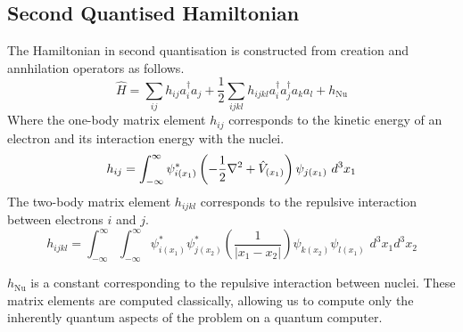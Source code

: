\subsection{Second Quantised Hamiltonian}
The Hamiltonian in second quantisation is constructed from creation and annhilation operators as follows.
\begin{equation*}
    \hat H =
    \sum_{ij} h_{ij} a^\dagger_i a_j +
    \frac{1}{2} \sum_{ijkl} h_{ijkl} a^\dagger_i a^\dagger_j a_k a_l +
    h_\text{Nu}
\end{equation*}
Where the one-body matrix element $h_{ij}$ corresponds to the kinetic energy of an electron and its interaction energy with the nuclei.
\begin{equation*}
h_{ij} = \int^\infty_{-\infty} \psi^*_{i(x_1)} \left( - \frac{1}{2} \nabla^2 + \hat V_{(x_1)} \right) \psi_{j(x_1)} \,\, d^3 x_1 \\
\end{equation*}
The two-body matrix element $h_{ijkl}$ corresponds to the repulsive interaction between electrons $i$ and $j$.
\begin{equation*}
h_{ijkl} = \int^\infty_{-\infty} \int^\infty_{-\infty} \psi^*_{i(x_1)} \psi^*_{j(x_2)} \left( \frac{1}{|x_1 - x_2|} \right) \psi_{k(x_2)} \psi_{l(x_1)} \,\, d^3 x_1 d^3 x_2
\end{equation*}

$h_\text{Nu}$ is a constant corresponding to the repulsive interaction between nuclei. These matrix elements are computed classically, allowing us to compute only the inherently quantum aspects of the problem on a quantum computer.

